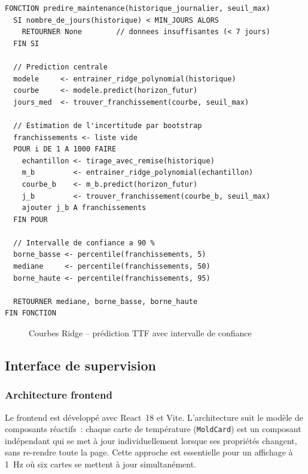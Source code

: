 \begin{algorithm}[htbp]
\caption{Prédiction de maintenance par Ridge et intervalle de confiance bootstrap}
\label{alg:ridge_boot}
\begin{minipage}{0.95\textwidth}
\begin{verbatim}
FONCTION predire_maintenance(historique_journalier, seuil_max)
  SI nombre_de_jours(historique) < MIN_JOURS ALORS
    RETOURNER None        // donnees insuffisantes (< 7 jours)
  FIN SI

  // Prediction centrale
  modele     <- entrainer_ridge_polynomial(historique)
  courbe     <- modele.predict(horizon_futur)
  jours_med  <- trouver_franchissement(courbe, seuil_max)

  // Estimation de l'incertitude par bootstrap
  franchissements <- liste vide
  POUR i DE 1 A 1000 FAIRE
    echantillon <- tirage_avec_remise(historique)
    m_b         <- entrainer_ridge_polynomial(echantillon)
    courbe_b    <- m_b.predict(horizon_futur)
    j_b         <- trouver_franchissement(courbe_b, seuil_max)
    ajouter j_b A franchissements
  FIN POUR

  // Intervalle de confiance a 90 %
  borne_basse <- percentile(franchissements, 5)
  mediane     <- percentile(franchissements, 50)
  borne_haute <- percentile(franchissements, 95)

  RETOURNER mediane, borne_basse, borne_haute
FIN FONCTION
\end{verbatim}
\end{minipage}
\end{algorithm}

\begin{figure}[htbp]
  \centering
  \caption{Courbes Ridge -- prédiction TTF avec intervalle de confiance}
  \label{fig:bootstrap_ci_concept}
\end{figure}

\subsection{Interface de supervision}

\subsubsection{Architecture frontend}

Le frontend est développé avec React~18 et Vite. L'architecture suit le modèle de composants réactifs~: chaque carte de température (\texttt{MoldCard}) est un composant indépendant qui se met à jour individuellement lorsque ses propriétés changent, sans re-rendre toute la page. Cette approche est essentielle pour un affichage à 1~Hz où six cartes se mettent à jour simultanément.

